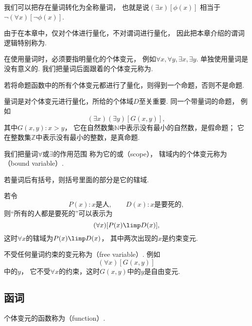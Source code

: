 我们可以把存在量词转化为全称量词，
也就是说\(
	(\exists x)
	[\phi(x)]
\)
相当于\(
	\neg(\forall x)
	[\neg\phi(x)]
\).


由于在本章中，仅对个体进行量化，不对谓词进行量化，
因此把本章介绍的谓词逻辑特别称为.

在使用量词时，必须要指明量化的个体变元，
例如\(\forall x,\forall y,\exists x,\exists y\).
单独使用量词是没有意义的.
我们把量词后面跟着的个体变元称为.

若将命题函数中的所有个体变元都进行了量化，则得到一个命题，否则不是命题.

量词是对个体变元进行量化，所给的个体域\(D\)至关重要.
同一个带量词的命题，
例如\begin{equation*}
	(\exists x)(\exists y)[G(x,y)],
\end{equation*}
其中\(G(x,y): x>y\)，
它在自然数集\(\mathbb{N}\)中表示没有最小的自然数，是假命题；
它在整数集\(\mathbb{Z}\)中表示没有最小的整数，是真命题.

我们把量词\(\forall\)或\(\exists\)的作用范围
称为它的或（scope），
辖域内的个体变元称为（bound variable）.

若量词后有括号，则括号里面的部分是它的辖域.

若令\begin{equation*}
	P(x):
	\text{$x$是人},
	\qquad
	D(x):
	\text{$x$是要死的},
\end{equation*}
则“所有的人都是要死的”可以表示为\begin{equation*}
	(\forall x)[P(x) \limp D(x)],
\end{equation*}
这时\(\forall x\)的辖域为\(P(x) \limp D(x)\)，
其中两次出现的\(x\)是约束变元.

不受任何量词约束的变元称为（free variable）.
例如\begin{equation*}
	(\forall x)[G(x,y)]
\end{equation*}中的\(y\)，
它不受\(\forall x\)的约束，这时\(G(x,y)\)中的\(y\)是自由变元.

\subsection{函词}
个体变元的函数称为（function）.


